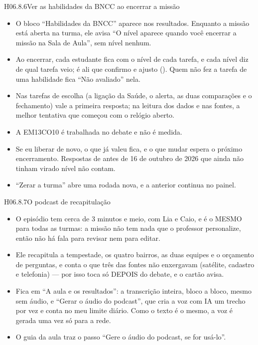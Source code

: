 \begin{historia}{H06.8.6}{Ver as habilidades da BNCC ao encerrar a missão}{\pronto}
\aceite
\begin{itemize}
  \item O bloco \enquote{Habilidades da BNCC} aparece nos resultados. Enquanto
    a missão está aberta na turma, ele avisa \enquote{O nível aparece quando
    você encerrar a missão na Sala de Aula}, sem nível nenhum.
  \item Ao encerrar, cada estudante fica com o nível de cada tarefa, e cada
    nível diz de qual tarefa veio; é ali que confirmo e ajusto ().
    Quem não fez a tarefa de uma habilidade fica \enquote{Não avaliado} nela.
  \item Nas tarefas de escolha (a ligação da Saúde, o alerta, as duas
    comparações e o fechamento) vale a primeira resposta; na leitura dos dados
    e nas fontes, a melhor tentativa que começou com o relógio aberto.
  \item A EM13CO10 é trabalhada no debate e não é medida.
  \item Se eu liberar de novo, o que já valeu fica, e o que mudar espera o
    próximo encerramento. Respostas de antes de 16 de outubro de 2026 que
    ainda não tinham virado nível não contam.
  \item \enquote{Zerar a turma} abre uma rodada nova, e a anterior continua no
    painel.
\end{itemize}
\end{historia}

\begin{historia}{H06.8.7}{O podcast de recapitulação}{\parcial}
\aceite
\begin{itemize}
  \item O episódio tem cerca de 3 minutos e meio, com Lia e Caio, e é o MESMO
    para todas as turmas: a missão não tem nada que o professor personalize,
    então não há fala para revisar nem para editar.
  \item Ele recapitula a tempestade, os quatro bairros, as duas equipes e o
    orçamento de perguntas, e conta o que três das fontes não enxergavam
    (satélite, cadastro e telefonia) --- por isso toca só DEPOIS do debate, e o
    cartão avisa.
  \item Fica em \enquote{A aula e os resultados}: a transcrição inteira, bloco a
    bloco, mesmo sem áudio, e \enquote{Gerar o áudio do podcast}, que cria a voz
    com IA um trecho por vez e conta no meu limite diário. Como o texto é o
    mesmo, a voz é gerada uma vez só para a rede.
  \item O guia da aula traz o passo \enquote{Gere o áudio do podcast, se for
    usá-lo}.
\end{itemize}
\end{historia}

